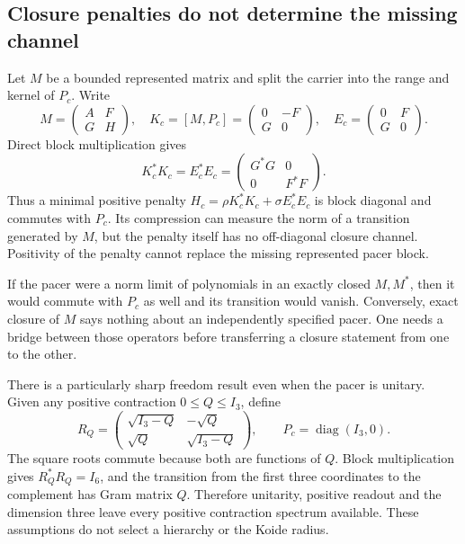 \subsection{Closure penalties do not determine the missing channel}
Let $M$ be a bounded represented matrix and split the carrier into
the range and kernel of $P_c$. Write
\begin{equation}
 M=\begin{pmatrix}A&F\\G&H\end{pmatrix},\quad
 K_c=[M,P_c]=\begin{pmatrix}0&-F\\G&0\end{pmatrix},\quad
 E_c=\begin{pmatrix}0&F\\G&0\end{pmatrix}.
\end{equation}
Direct block multiplication gives
\begin{equation}
 K_c^*K_c=E_c^*E_c=
 \begin{pmatrix}G^*G&0\\0&F^*F\end{pmatrix}.
\end{equation}
Thus a minimal positive penalty
$H_c=\rho K_c^*K_c+\sigma E_c^*E_c$ is block diagonal and
commutes with $P_c$. Its compression can measure the norm of a
transition generated by $M$, but the penalty itself has no off-diagonal
closure channel. Positivity of the penalty cannot replace the missing
represented pacer block.

If the pacer were a norm limit of polynomials in an exactly closed
$M,M^*$, then it would commute with $P_c$ as well and its transition
would vanish. Conversely, exact closure of $M$ says nothing about
an independently specified pacer. One needs a bridge between those
operators before transferring a closure statement from one to the other.

There is a particularly sharp freedom result even when the pacer is
unitary. Given any positive contraction $0\leq Q\leq I_3$, define
\begin{equation}
 R_Q=\begin{pmatrix}\sqrt{I_3-Q}&-\sqrt Q\\
                         \sqrt Q&\sqrt{I_3-Q}\end{pmatrix},\qquad
 P_c=\operatorname{diag}(I_3,0).
\end{equation}
The square roots commute because both are functions of $Q$.
Block multiplication gives $R_Q^*R_Q=I_6$, and the transition from
the first three coordinates to the complement has Gram matrix $Q$.
Therefore unitarity, positive readout and the dimension three leave
every positive contraction spectrum available. These assumptions
do not select a hierarchy or the Koide radius.

